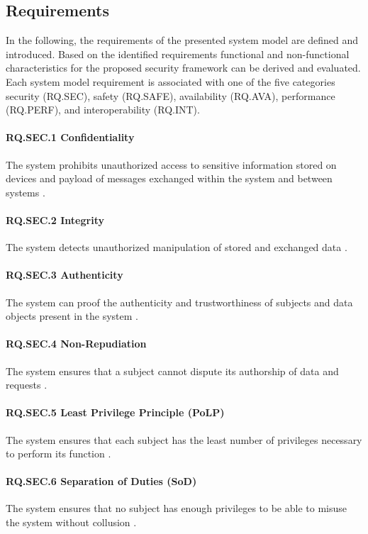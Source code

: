 \subsection{Requirements}
In the following, the requirements of the presented system model are defined and introduced.
Based on the identified requirements functional and non-functional characteristics for the proposed security framework can be derived and evaluated.
Each system model requirement is associated with one of the five categories security (RQ.SEC), safety (RQ.SAFE), availability (RQ.AVA), performance (RQ.PERF), and interoperability (RQ.INT).

\paragraph{RQ.SEC.1 Confidentiality}
The system prohibits unauthorized access to sensitive information stored on devices and payload of messages exchanged within the system and between systems \cite{Eckert2023}.
\paragraph{RQ.SEC.2 Integrity}
The system detects unauthorized manipulation of stored and exchanged data \cite{Eckert2023}.
\paragraph{RQ.SEC.3 Authenticity}
The system can proof the authenticity and trustworthiness of subjects and data objects present in the system \cite{Eckert2023}.
\paragraph{RQ.SEC.4 Non-Repudiation}
The system ensures that a subject cannot dispute its authorship of data and requests \cite{Eckert2023}.
\paragraph{RQ.SEC.5 Least Privilege Principle (PoLP)}
The system ensures that each subject has the least number of privileges necessary to perform its function \cite{JTF2020}.
\paragraph{RQ.SEC.6 Separation of Duties (SoD)}
The system ensures that no subject has enough privileges to be able to misuse the system without collusion \cite{JTF2020}.
